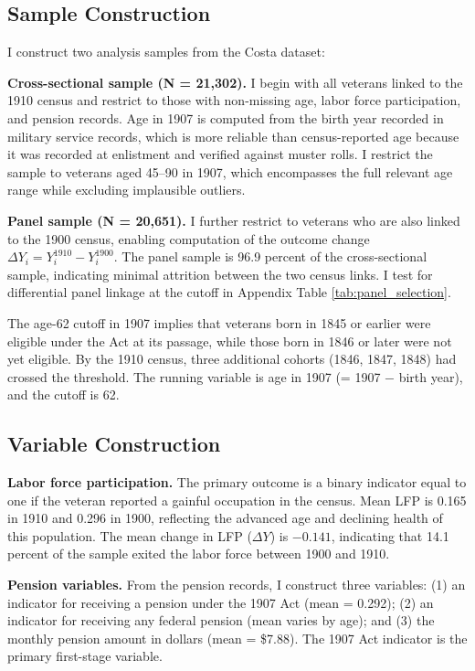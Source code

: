 \documentclass[12pt]{article}
\begin{document}
\subsection{Sample Construction}

I construct two analysis samples from the Costa dataset:

\textbf{Cross-sectional sample (N = 21,302).} I begin with all veterans linked to the 1910 census and restrict to those with non-missing age, labor force participation, and pension records. Age in 1907 is computed from the birth year recorded in military service records, which is more reliable than census-reported age because it was recorded at enlistment and verified against muster rolls. I restrict the sample to veterans aged 45--90 in 1907, which encompasses the full relevant age range while excluding implausible outliers.

\textbf{Panel sample (N = 20,651).} I further restrict to veterans who are also linked to the 1900 census, enabling computation of the outcome change $\Delta Y_i = Y_i^{1910} - Y_i^{1900}$. The panel sample is 96.9 percent of the cross-sectional sample, indicating minimal attrition between the two census links. I test for differential panel linkage at the cutoff in Appendix Table \ref{tab:panel_selection}.

The age-62 cutoff in 1907 implies that veterans born in 1845 or earlier were eligible under the Act at its passage, while those born in 1846 or later were not yet eligible. By the 1910 census, three additional cohorts (1846, 1847, 1848) had crossed the threshold. The running variable is age in 1907 (= 1907 $-$ birth year), and the cutoff is 62.

\subsection{Variable Construction}

\textbf{Labor force participation.} The primary outcome is a binary indicator equal to one if the veteran reported a gainful occupation in the census. Mean LFP is 0.165 in 1910 and 0.296 in 1900, reflecting the advanced age and declining health of this population. The mean change in LFP ($\Delta Y$) is $-0.141$, indicating that 14.1 percent of the sample exited the labor force between 1900 and 1910.

\textbf{Pension variables.} From the pension records, I construct three variables: (1) an indicator for receiving a pension under the 1907 Act (mean = 0.292); (2) an indicator for receiving any federal pension (mean varies by age); and (3) the monthly pension amount in dollars (mean = \$7.88). The 1907 Act indicator is the primary first-stage variable.
\end{document}
